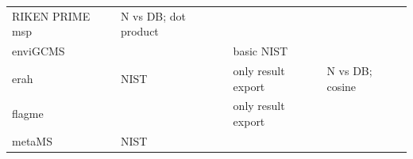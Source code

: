 \documentclass[]{article}
\begin{document}
\begin{longtable}[]{@{}llll@{}}
\begin{minipage}[t]{0.17\columnwidth}
RIKEN PRIME msp\strut
\end{minipage} & \begin{minipage}[t]{0.46\columnwidth}\raggedright
N vs DB; dot product\strut
\end{minipage}\tabularnewline
\begin{minipage}[t]{0.09\columnwidth}\raggedright
enviGCMS\strut
\end{minipage} & \begin{minipage}[t]{0.17\columnwidth}\raggedright
\strut
\end{minipage} & \begin{minipage}[t]{0.17\columnwidth}\raggedright
basic NIST\strut
\end{minipage} & \begin{minipage}[t]{0.46\columnwidth}\raggedright
\strut
\end{minipage}\tabularnewline
\begin{minipage}[t]{0.09\columnwidth}\raggedright
erah\strut
\end{minipage} & \begin{minipage}[t]{0.17\columnwidth}\raggedright
NIST\strut
\end{minipage} & \begin{minipage}[t]{0.17\columnwidth}\raggedright
only result export\strut
\end{minipage} & \begin{minipage}[t]{0.46\columnwidth}\raggedright
N vs DB; cosine\strut
\end{minipage}\tabularnewline
\begin{minipage}[t]{0.09\columnwidth}\raggedright
flagme\strut
\end{minipage} & \begin{minipage}[t]{0.17\columnwidth}\raggedright
\strut
\end{minipage} & \begin{minipage}[t]{0.17\columnwidth}\raggedright
only result export\strut
\end{minipage} & \begin{minipage}[t]{0.46\columnwidth}\raggedright
\strut
\end{minipage}\tabularnewline
\begin{minipage}[t]{0.09\columnwidth}\raggedright
metaMS\strut
\end{minipage} & \begin{minipage}[t]{0.17\columnwidth}\raggedright
NIST\strut
\end{minipage} & \begin{minipage}[t]{0.17\columnwidth}\raggedright

\end{minipage}
\end{longtable}
\end{document}
